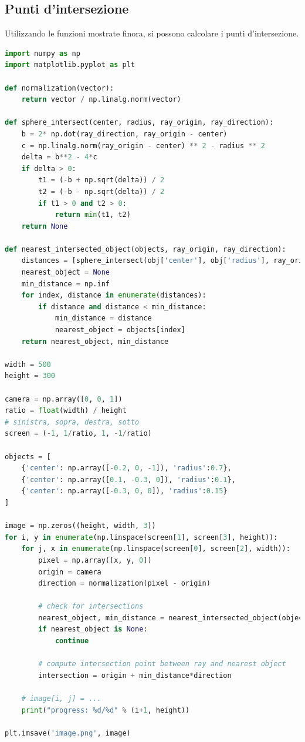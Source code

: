 \documentclass[9pt,a4paper,twoside]{tau}
\begin{document}
\subsection{Punti d'intersezione}
Utilizzando le funzioni mostrate finora, si possono calcolare i punti d'intersezione.
\begin{lstlisting}[language=Python]
import numpy as np
import matplotlib.pyplot as plt

def normalization(vector):
    return vector / np.linalg.norm(vector)

def sphere_intersect(center, radius, ray_origin, ray_direction):
    b = 2* np.dot(ray_direction, ray_origin - center)
    c = np.linalg.norm(ray_origin - center) ** 2 - radius ** 2
    delta = b**2 - 4*c
    if delta > 0:
        t1 = (-b + np.sqrt(delta)) / 2
        t2 = (-b - np.sqrt(delta)) / 2
        if t1 > 0 and t2 > 0:
            return min(t1, t2)
    return None

def nearest_intersected_object(objects, ray_origin, ray_direction):
    distances = [sphere_intersect(obj['center'], obj['radius'], ray_origin, ray_direction) for obj in objects]
    nearest_object = None
    min_distance = np.inf
    for index, distance in enumerate(distances):
        if distance and distance < min_distance:
            min_distance = distance
            nearest_object = objects[index]
    return nearest_object, min_distance

width = 500
height = 300

camera = np.array([0, 0, 1])
ratio = float(width) / height
# sinistra, sopra, destra, sotto
screen = (-1, 1/ratio, 1, -1/ratio)  

objects = [
    {'center': np.array([-0.2, 0, -1]), 'radius':0.7},
    {'center': np.array([0.1, -0.3, 0]), 'radius':0.1},
    {'center': np.array([-0.3, 0, 0]), 'radius':0.15}
]

image = np.zeros((height, width, 3))
for i, y in enumerate(np.linspace(screen[1], screen[3], height)):
    for j, x in enumerate(np.linspace(screen[0], screen[2], width)):
        pixel = np.array([x, y, 0])
        origin = camera
        direction = normalization(pixel - origin)

        # check for intersections
        nearest_object, min_distance = nearest_intersected_object(objects, origin, direction)
        if nearest_object is None:
            continue

        # compute intersection point between ray and nearest object
        intersection = origin + min_distance*direction
        
    # image[i, j] = ...  
    print("progress: %d/%d" % (i+1, height))

plt.imsave('image.png', image)
\end{lstlisting}
\end{document}
